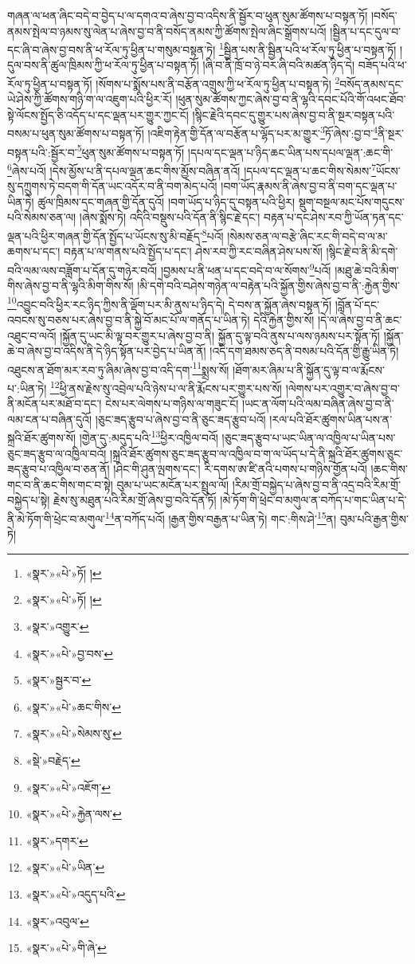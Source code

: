 གཞན་ལ་ཕན་ཞིང་བདེ་བ་བྱེད་པ་ལ་དགའ་བ་ཞེས་བྱ་བ་འདིས་ནི་སྦྱོར་བ་ཕུན་སུམ་ཚོགས་པ་བསྟན་ཏོ། །བསོད་ནམས་སྤེལ་བ་ཉམས་སུ་ལེན་པ་ཞེས་བྱ་བ་ནི་བསོད་ནམས་ཀྱི་ཚོགས་སྤེལ་ཞིང་སྒྲོགས་པའོ། །སྦྱིན་པ་དང་དུལ་བ་དང་ཞི་བ་ཞེས་བྱ་བས་ནི་ཕ་རོལ་ཏུ་ཕྱིན་པ་གསུམ་བསྟན་ཏེ། \footnote{«སྣར་»«པེ་»ཏོ། ། }སྦྱིན་པས་ནི་སྦྱིན་པའི་ཕ་རོལ་ཏུ་ཕྱིན་པ་བསྟན་ཏོ། །དུལ་བས་ནི་ཚུལ་ཁྲིམས་ཀྱི་ཕ་རོལ་ཏུ་ཕྱིན་པ་བསྟན་ཏོ། །ཞི་བ་ནི་ཁྲོ་བ་ཉེ་བར་ཞི་བའི་མཚན་ཉིད་དེ། བཟོད་པའི་ཕ་རོལ་ཏུ་ཕྱིན་པ་བསྟན་ཏོ། །སོགས་པ་སྨོས་པས་ནི་བརྩོན་འགྲུས་ཀྱི་ཕ་རོལ་ཏུ་ཕྱིན་པ་བསྟན་ཏེ། \footnote{«སྣར་»«པེ་»ཏོ། ། }བསོད་ནམས་དང་ཡེ་ཤེས་ཀྱི་ཚོགས་གཉི་ག་ལ་འཇུག་པའི་ཕྱིར་རོ། །ཕུན་སུམ་ཚོགས་ཀྱང་ཞེས་བྱ་བ་ནི་ལྷའི་དབང་པོའི་གོ་འཕང་ཐོབ་སྟེ་ལོངས་སྤྱོད་ཅི་འདོད་པ་དང་ལྡན་པར་གྱུར་ཀྱང་ངོ། །སྙིང་རྗེའི་དབང་དུ་གྱུར་པས་ཞེས་བྱ་བ་ནི་སྔར་བསྟན་པའི་བསམ་པ་ཕུན་སུམ་ཚོགས་པ་བསྟན་ཏོ། །འཇིག་རྟེན་གྱི་དོན་ལ་བརྩོན་པ་ལྷོད་པར་མ་གྱུར་\footnote{«སྣར་»འགྱུར་}ཏོ་ཞེས་:བྱ་བ་\footnote{«སྣར་»«པེ་»བྱ་བས་}ནི་སྔར་བསྟན་པའི་:སྦྱོར་བ་\footnote{«སྣར་»སྦྱར་བ་}ཕུན་སུམ་ཚོགས་པ་བསྟན་ཏོ། །དཔལ་དང་ལྡན་པ་ཉིད་ཆང་ཡིན་པས་དཔལ་ལྡན་:ཆང་གི་\footnote{«སྣར་»«པེ་»ཆང་གིས་}ཞེས་པའོ། །དེས་མྱོས་པ་ནི་དཔལ་ལྡན་ཆང་གིས་མྱོས་བཞིན་ནའོ། །དཔལ་དང་ལྡན་པ་ཆང་གིས་སེམས་\footnote{«སྣར་»«པེ་»སེམས་སུ་}ཡོངས་སུ་དཀྲུགས་ཏེ་བདག་གི་དོན་ཡང་འདོར་བ་ནི་བག་མེད་པའོ། །བག་ཡོད་རྣམས་ནི་ཞེས་བྱ་བ་ནི་བག་དང་ལྡན་པ་ཡིན་ཏེ། ཚུལ་ཁྲིམས་དང་གཞན་གྱི་དོན་དུའོ། །བག་ཡོད་པ་ཉིད་དུ་བསྟན་པའི་ཕྱིར། སྡུག་བསྔལ་མང་པོས་གདུངས་པའི་སེམས་ཅན་ལ། །ཞེས་སྨོས་ཏེ། འདིའི་བསྡུས་པའི་དོན་ནི་སྙིང་རྗེ་དང་། བརྟན་པ་དང་ཤེས་རབ་ཀྱི་ཡོན་ཏན་དང་ལྡན་པའི་ཕྱིར་གཞན་གྱི་དོན་སྤྱོད་པ་ཡོངས་སུ་མི་བརྗོད་\footnote{«སྡེ་»བརྗེད་}པའོ། །སེམས་ཅན་ལ་བརྩེ་ཞིང་རང་གི་བདེ་བ་ལ་མ་ཆགས་པ་དང་། བརྟན་པ་ལ་གནས་པའི་སྤྱོད་པ་དང་། ཤེས་རབ་ཀྱི་རང་བཞིན་ཤེས་པས་སོ། །སྙིང་རྗེ་བ་ནི་མི་དགེ་བའི་ལམ་ལས་བཟློག་པ་དོན་དུ་གཉེར་བའོ། །བྱམས་པ་ནི་ཕན་པ་དང་བདེ་བ་ལ་སོགས་\footnote{«སྣར་»«པེ་»འཇོག་}པའོ། །མཐུ་ཆེ་བའི་མིག་གིས་ཞེས་བྱ་བ་ནི་ལྷའི་མིག་གིས་སོ། །མི་དགེ་བའི་བཤེས་གཉེན་ལ་བརྟེན་པའི་སྐྱོན་གྱིས་ཞེས་བྱ་བ་ནི་:རྐྱེན་གྱིས་\footnote{«སྣར་»«པེ་»རྐྱེན་ལས་}འབྱུང་བའི་ཕྱིར་རང་ཉིད་ཀྱིས་ནི་ལྡོག་པར་མི་ནུས་པ་ཉིད་དེ། དེ་བས་ན་སྐྱོན་ཞེས་བསྟན་ཏོ། །བློན་པོ་དང་འབངས་སུ་བཅས་པར་ཞེས་བྱ་བ་ནི་སྐྱེ་བོ་མང་པོ་ལ་གནོད་པ་ཡིན་ཏེ། དེའི་རྐྱེན་གྱིས་སོ། །དེ་ལ་ཞེས་བྱ་བ་ནི་ཆང་འཐུང་བ་ལའོ། །སྐྱོན་དུ་ཡང་མི་ལྟ་བར་གྱུར་པ་ཞེས་བྱ་བ་ནི། སྐྱོན་དུ་ལྟ་བའི་ནུས་པ་ལས་ཉམས་པར་སྟོན་ཏོ། །སྐྱོན་ཆེ་བ་ཞེས་བྱ་བ་འདིས་ནི་དེ་ཉིད་སྟོན་པར་བྱེད་པ་ཡིན་ནོ། །འདི་དག་ཐམས་ཅད་ནི་བསམ་པའི་དོན་གྱི་རྒྱུ་ཡིན་ཏེ། འཐུངས་ན་ཐོག་མར་རབ་ཏུ་ཞིམ་ཞེས་བྱ་བ་འདི་དག་\footnote{«སྣར་»དགར་}སྨྲས་སོ། །ཐོག་མར་ཞིམ་པ་ནི་སྐྱོན་དུ་ལྟ་བ་ལ་རྨོངས་པ་:ཡིན་ཏེ། \footnote{«སྣར་»«པེ་»ཡིན་}ཕྱི་ནས་རྗེས་སུ་འབྲེལ་པའི་ཉེས་པ་ལ་ནི་རྨོངས་པར་གྱུར་པས་སོ། །ལེགས་པར་འགྱུར་བ་ཞེས་བྱ་བ་ནི་མངོན་པར་མཐོ་བ་དང་། ངེས་པར་ལེགས་པ་གཉིས་ལ་གཟུང་ངོ། །ཡང་ན་ལོག་པའི་ལམ་བཞིན་ཞེས་བྱ་བ་ནི་ལམ་ངན་པ་བཞིན་དུའོ། །ཅུང་ཟད་རྩུབ་པ་ཞེས་བྱ་བ་ནི་ཅུང་ཟད་རྩུབ་པའོ། །རལ་པའི་ཐོར་ཚུགས་ཡིན་པས་ན་སྐྲའི་ཐོར་ཚུགས་སོ། །གྱེན་དུ་:མདུད་པའི་\footnote{«སྣར་»«པེ་»འདུད་པའི་}ཕྱིར་འཁྱིལ་བའོ། །ཅུང་ཟད་རྩུབ་པ་ཡང་ཡིན་ལ་འཁྱིལ་པ་ཡིན་པས་ཅུང་ཟད་རྩུབ་ལ་འཁྱིལ་བའོ། །སྐྲའི་ཐོར་ཚུགས་ཅུང་ཟད་རྩུབ་ལ་འཁྱིལ་བ་ག་ལ་ཡོད་པ་དེ་ནི་སྐྲའི་ཐོར་ཚུགས་ཅུང་ཟད་རྩུབ་པ་འཁྱིལ་བ་ཅན་ནོ། །ཤིང་གི་ཤུན་ལྤགས་དང་། རི་དགས་ཨ་ཛི་ནའི་པགས་པ་གཉིས་གྱོན་པའོ། །ཆང་གིས་གང་བ་ནི་ཆང་གིས་གང་བ་སྟེ། བུམ་པ་ཡང་མངོན་པར་སྤྲུལ་ལོ། །རིམ་གྲོ་བསྐྱེད་པ་ཞེས་བྱ་བ་ནི་འདྲ་བའི་རིམ་གྲོ་བསྐྱེད་པ་སྟེ། རྗེས་སུ་མཐུན་པའི་རིམ་གྲོ་ཞེས་བྱ་བའི་དོན་ཏོ། །མེ་ཏོག་གི་ཕྲེང་བ་མགུལ་ན་བཀོད་པ་གང་ཡིན་པ་དེ་ནི་མེ་ཏོག་གི་ཕྲེང་བ་མགུལ་\footnote{«སྣར་»འབུལ་}ན་བཀོད་པའོ། །རྒྱན་གྱིས་བརྒྱན་པ་ཡིན་ཏེ། གང་:གིས་ཤེ་\footnote{«སྣར་»«པེ་»གི་ཞེ་}ན། བུམ་པའི་རྒྱན་གྱིས་ཏེ། 